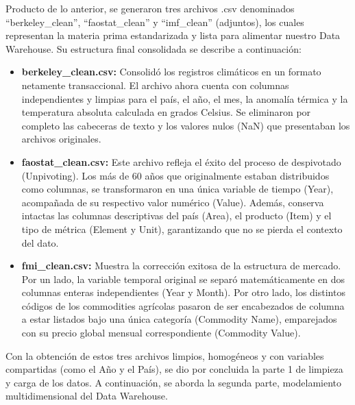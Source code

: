 \noindent Producto de lo anterior, se generaron tres archivos .csv denominados ``berkeley\_clean'', ``faostat\_clean'' y ``imf\_clean'' (adjuntos), los cuales representan la materia prima estandarizada y lista para alimentar nuestro Data Warehouse. Su estructura final consolidada se describe a continuación: 
\begin{itemize}
	\item \textbf{berkeley\_clean.csv:} Consolidó los registros climáticos en un formato netamente transaccional. El archivo ahora cuenta con columnas independientes y limpias para el país, el año, el mes, la anomalía térmica y la temperatura absoluta calculada en grados Celsius. Se eliminaron por completo las cabeceras de texto y los valores nulos (NaN) que presentaban los archivos originales.
	
	\item \textbf{faostat\_clean.csv: }Este archivo refleja el éxito del proceso de despivotado (Unpivoting). Los más de 60 años que originalmente estaban distribuidos como columnas, se transformaron en una única variable de tiempo (Year), acompañada de su respectivo valor numérico (Value). Además, conserva intactas las columnas descriptivas del país (Area), el producto (Item) y el tipo de métrica (Element y Unit), garantizando que no se pierda el contexto del dato. 
	
	\item \textbf{fmi\_clean.csv: }Muestra la corrección exitosa de la estructura de mercado. Por un lado, la variable temporal original se separó matemáticamente en dos columnas enteras independientes (Year y Month). Por otro lado, los distintos códigos de los commodities agrícolas pasaron de ser encabezados de columna a estar listados bajo una única categoría (Commodity Name), emparejados con su precio global mensual correspondiente (Commodity Value). 
\end{itemize}

\noindent Con la obtención de estos tres archivos limpios, homogéneos y con variables compartidas (como el Año y el País), se dio por concluida la parte 1 de limpieza y carga de los datos. A continuación, se aborda la segunda parte, modelamiento multidimensional del Data Warehouse. 